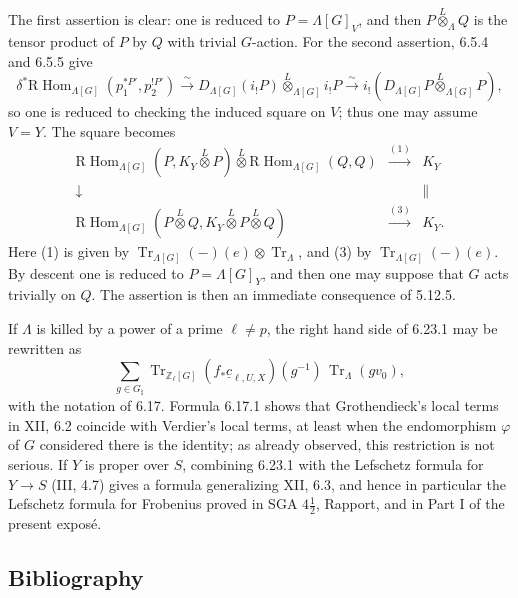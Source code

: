 \documentclass[12pt]{article}
\newcommand{\bZ}{\mathbb Z}
\newcommand{\RHom}{\mathrm R\!\operatorname{Hom}}
\newcommand{\Tr}{\operatorname{Tr}}
\begin{document}
The first assertion is clear: one is reduced to $P=\Lambda[G]_V$, and then
$P\overset{L}{\otimes}_\Lambda Q$ is the tensor product of $P$ by $Q$ with trivial
$G$-action. For the second assertion, 6.5.4 and 6.5.5 give
\[
\delta^*\RHom_{\Lambda[G]}(p_1^{*P'},p_2^{!P'})
\xrightarrow{\sim}
D_{\Lambda[G]}(i_!P)\overset{L}{\otimes}_{\Lambda[G]}i_!P
\xrightarrow{\sim}
i_!(D_{\Lambda[G]}P\overset{L}{\otimes}_{\Lambda[G]}P),
\]
so one is reduced to checking the induced square on $V$; thus one may assume
$V=Y$. The square becomes
\[
\begin{array}{ccc}
\RHom_{\Lambda[G]}(P,K_Y\overset{L}{\otimes}P)
\overset{L}{\otimes}\RHom_{\Lambda[G]}(Q,Q)&\xrightarrow{(1)}&K_Y\\[8pt]
\downarrow && \parallel\\[8pt]
\RHom_{\Lambda[G]}(P\overset{L}{\otimes}Q,
K_Y\overset{L}{\otimes}P\overset{L}{\otimes}Q)&\xrightarrow{(3)}&K_Y.
\end{array}
\]
Here (1) is given by $\Tr_{\Lambda[G]}(-)(e)\otimes\Tr_\Lambda$, and (3) by
$\Tr_{\Lambda[G]}(-)(e)$. By descent one is reduced to
$P=\Lambda[G]_Y$, and then one may suppose that $G$ acts trivially on $Q$. The
assertion is then an immediate consequence of 5.12.5.

If $\Lambda$ is killed by a power of a prime $\ell\ne p$, the right hand side of
6.23.1 may be rewritten as
\[
\sum_{g\in G_\natural}
\Tr_{\bZ_\ell[G]}(f_*\underline c_{\ell,U,X})(g^{-1})\,\Tr_\Lambda(gv_0),
\]
with the notation of 6.17. Formula 6.17.1 shows that Grothendieck's local terms in
XII, 6.2 coincide with Verdier's local terms, at least when the endomorphism
$\varphi$ of $G$ considered there is the identity; as already observed, this
restriction is not serious. If $Y$ is proper over $S$, combining 6.23.1 with the
Lefschetz formula for $Y\to S$ (III, 4.7) gives a formula generalizing XII, 6.3,
and hence in particular the Lefschetz formula for Frobenius proved in SGA
$4\frac12$, Rapport, and in Part I of the present exposé.

\subsection*{Bibliography}
\end{document}
